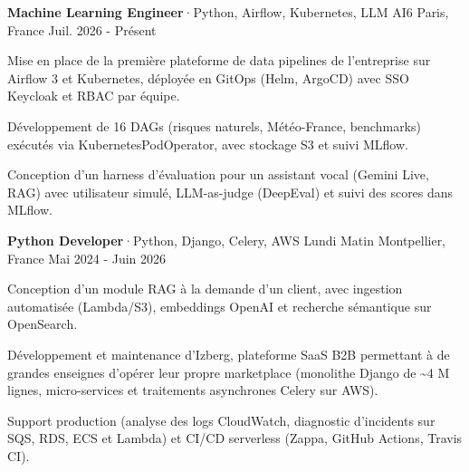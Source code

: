 

\begin{cventries}

  \cventry
    {\textbf{Machine Learning Engineer}{\enskip·\enskip}{\fontsize{7.5pt}{1em}\selectfont Python, Airflow, Kubernetes, LLM}} %
    {AI6} %
    {Paris, France} %
    {Juil. 2026 - Présent} %
    {
      \begin{cvitems} %
        \item {Mise en place de la première plateforme de data pipelines de l’entreprise sur Airflow 3 et Kubernetes, déployée en GitOps (Helm, ArgoCD) avec SSO Keycloak et RBAC par équipe.}
        \item {Développement de 16 DAGs (risques naturels, Météo-France, benchmarks) exécutés via KubernetesPodOperator, avec stockage S3 et suivi MLflow.}
        \item {Conception d’un harness d’évaluation pour un assistant vocal (Gemini Live, RAG) avec utilisateur simulé, LLM-as-judge (DeepEval) et suivi des scores dans MLflow.}
      \end{cvitems}
    }


  \cventry
    {\textbf{Python Developer}{\enskip·\enskip}{\fontsize{7.5pt}{1em}\selectfont Python, Django, Celery, AWS}} %
    {Lundi Matin} %
    {Montpellier, France} %
    {Mai 2024 - Juin 2026} %
    {
      \begin{cvitems} %
        \item {Conception d’un module RAG à la demande d’un client, avec ingestion automatisée (Lambda/S3), embeddings OpenAI et recherche sémantique sur OpenSearch.}
        \item {Développement et maintenance d’Izberg, plateforme SaaS B2B permettant à de grandes enseignes d’opérer leur propre marketplace (monolithe Django de \textasciitilde 4 M lignes, micro-services et traitements asynchrones Celery sur AWS).}
        \item {Support production (analyse des logs CloudWatch, diagnostic d’incidents sur SQS, RDS, ECS et Lambda) et CI/CD serverless (Zappa, GitHub Actions, Travis CI).}
      \end{cvitems}
    }



\end{cventries}
